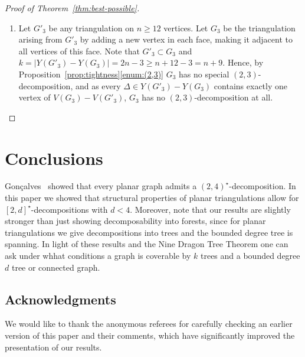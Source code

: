 \documentclass[a4paper,10pt]{article}
\theoremstyle{plain}
\begin{document}
\begin{proof}[Proof of Theorem~\ref{thm:best-possible}]
\begin{enumerate}[label = (\roman*), start = 2]
  \item Let $G'_3$ be any triangulation on $n \geq 12$ vertices.
   Let $G_3$ be the triangulation arising from $G'_3$ by adding a new vertex in each face, making it adjacent to all vertices of this face.
   Note that $G'_3 \subset G_3$ and $k = |Y(G'_3)-Y(G_3)| = 2n-3 \geq n+12-3 = n+9$.
   Hence, by Proposition~\ref{prop:tightness}\ref{enum:(2,3)} $G_3$ has no special $(2,3)$-decomposition, and as every $\Delta \in Y(G'_3) - Y(G_3)$ contains exactly one vertex of $V(G_3) - V(G'_3)$, $G_3$ has no $(2,3)$-decomposition at all.
 \end{enumerate}
\end{proof}















\section{Conclusions}\label{sec:conc}


Gon\c{c}alves~\cite{Gon-09} showed that every planar graph admits a $(2,4)^\star$-decomposition.
In this paper we showed that structural properties of planar triangulations allow for $[2,d]^\star$-decompositions with $d < 4$.
Moreover, note that our results are slightly stronger than just showing decomposability into forests, since for planar triangulations we give decompositions into trees and the bounded degree tree is spanning. 
In light of these results and the Nine Dragon Tree Theorem one can ask under whhat conditions a graph is coverable by $k$ trees and a bounded degree $d$ tree or connected graph.






\subsection*{Acknowledgments}

We would like to thank the anonymous referees for carefully checking an earlier version of this paper and their comments, which have significantly improved the presentation of our results.
























\end{document}
